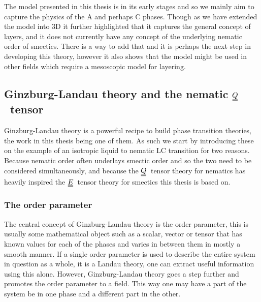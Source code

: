 \documentclass[12pt]{article}
\newcommand{\duf}[2]{\stackunder[0.5pt]{\stackunder[0.8pt]{\stackunder[1pt]{\ensuremath{#1}}{\rule{\widthof{\ensuremath{#2}}*\real{0.9}}{.1ex}}}{\rule{\widthof{\ensuremath{#2}}*\real{0.9}}{.1ex}}}{}}
\newcommand{\du}[1]{\duf{#1}{#1}}
\newcommand{\QQ}{\ensuremath{\du{Q}}}
\newcommand{\EE}{\ensuremath{\du{E}}}
\begin{document}

    The model presented in this thesis is in its early stages and so we mainly aim to capture the physics of the A and perhaps C phases.
    Though as we have extended the model into 3D it further highlighted that it captures the general concept of layers, and it does not currently have any concept of the underlying nematic order of smectics.
    There is a way to add that and it is perhaps the next step in developing this theory, however it also shows that the model might be used in other fields which require a mesoscopic model for layering.

    \subsection{Ginzburg-Landau theory and the nematic \QQ\ tensor}\label{sec:GL_nem}
        Ginzburg-Landau theory is a powerful recipe to build phase transition theories, the work in this thesis being one of them.
        As such we start by introducing these on the example of an isotropic liquid to nematic LC transition for two reasons.
        Because nematic order often underlays smectic order and so the two need to be considered simultaneously, and because the \QQ\ tensor theory for nematics has heavily inspired the \EE\ tensor theory for smectics this thesis is based on.

        \subsubsection{The order parameter}\label{sec:nem_op}
        The central concept of Ginzburg-Landau theory is the order parameter, this is usually some mathematical object such as a scalar, vector or tensor that has known values for each of the phases and varies in between them in mostly a smooth manner.
        If a single order parameter is used to describe the entire system in question as a whole, it is a Landau theory, one can extract useful information using this alone.
        However, Ginzburg-Landau theory goes a step further and promotes the order parameter to a field.
        This way one may have a part of the system be in one phase and a different part in the other.
\end{document}
